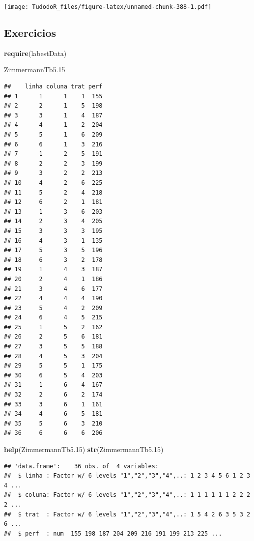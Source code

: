 \documentclass[
]{book}
\newenvironment{Shaded}{\begin{snugshade}}{\end{snugshade}}
\newcommand{\FloatTok}[1]{\textcolor[rgb]{0.00,0.00,0.81}{#1}}
\newcommand{\KeywordTok}[1]{\textcolor[rgb]{0.13,0.29,0.53}{\textbf{#1}}}
\newcommand{\NormalTok}[1]{#1}
\begin{document}
\texttt{[image: TudodoR\_files/figure-latex/unnamed-chunk-388-1.pdf]}

\hypertarget{exercicios}{%
\subsection{Exercicios}\label{exercicios}}

\begin{Shaded}
\begin{Highlighting}[]
\KeywordTok{require}\NormalTok{(labestData)}

\NormalTok{ZimmermannTb5}\FloatTok{.15}
\end{Highlighting}
\end{Shaded}

\begin{verbatim}
##    linha coluna trat perf
## 1      1      1    1  155
## 2      2      1    5  198
## 3      3      1    4  187
## 4      4      1    2  204
## 5      5      1    6  209
## 6      6      1    3  216
## 7      1      2    5  191
## 8      2      2    3  199
## 9      3      2    2  213
## 10     4      2    6  225
## 11     5      2    4  218
## 12     6      2    1  181
## 13     1      3    6  203
## 14     2      3    4  205
## 15     3      3    3  195
## 16     4      3    1  135
## 17     5      3    5  196
## 18     6      3    2  178
## 19     1      4    3  187
## 20     2      4    1  186
## 21     3      4    6  177
## 22     4      4    4  190
## 23     5      4    2  209
## 24     6      4    5  215
## 25     1      5    2  162
## 26     2      5    6  181
## 27     3      5    5  188
## 28     4      5    3  204
## 29     5      5    1  175
## 30     6      5    4  203
## 31     1      6    4  167
## 32     2      6    2  174
## 33     3      6    1  161
## 34     4      6    5  181
## 35     5      6    3  210
## 36     6      6    6  206
\end{verbatim}

\begin{Shaded}
\begin{Highlighting}[]
\KeywordTok{help}\NormalTok{(ZimmermannTb5}\FloatTok{.15}\NormalTok{) }
\KeywordTok{str}\NormalTok{(ZimmermannTb5}\FloatTok{.15}\NormalTok{)}
\end{Highlighting}
\end{Shaded}

\begin{verbatim}
## 'data.frame':    36 obs. of  4 variables:
##  $ linha : Factor w/ 6 levels "1","2","3","4",..: 1 2 3 4 5 6 1 2 3 4 ...
##  $ coluna: Factor w/ 6 levels "1","2","3","4",..: 1 1 1 1 1 1 2 2 2 2 ...
##  $ trat  : Factor w/ 6 levels "1","2","3","4",..: 1 5 4 2 6 3 5 3 2 6 ...
##  $ perf  : num  155 198 187 204 209 216 191 199 213 225 ...
\end{verbatim}
\end{document}
